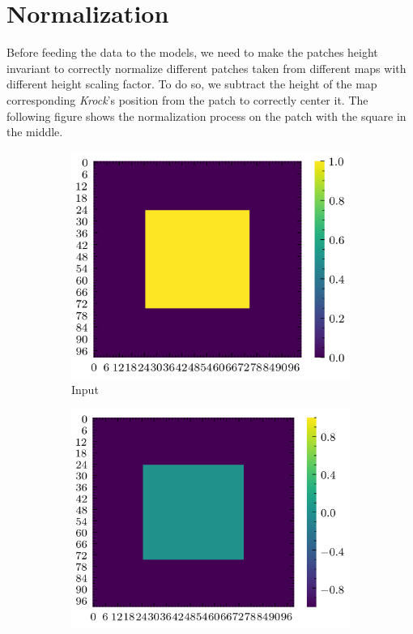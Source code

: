 \documentclass[../document.tex]{subfiles}
\begin{document}
\section{Normalization}
Before feeding the data to the models, we need to make the patches height invariant to correctly normalize different patches taken from different maps with different height scaling factor. To do so, we subtract the height of the map corresponding \emph{Krock}'s position from the patch to correctly center it. The following figure shows the normalization process on the patch with the square in the middle.
\begin{figure}[H]
    \centering
    \begin{subfigure}[b]{0.32\textwidth}
        \includegraphics[width=\textwidth]{../img/data-aug/2d/square-middle.png}
        \caption{Input}
    \end{subfigure}
    \begin{subfigure}[b]{0.32\textwidth}
        \includegraphics[width=\textwidth]{../img/data-aug/2d/square-middle-center.png}

\end{subfigure}
\end{figure}
\end{document}
